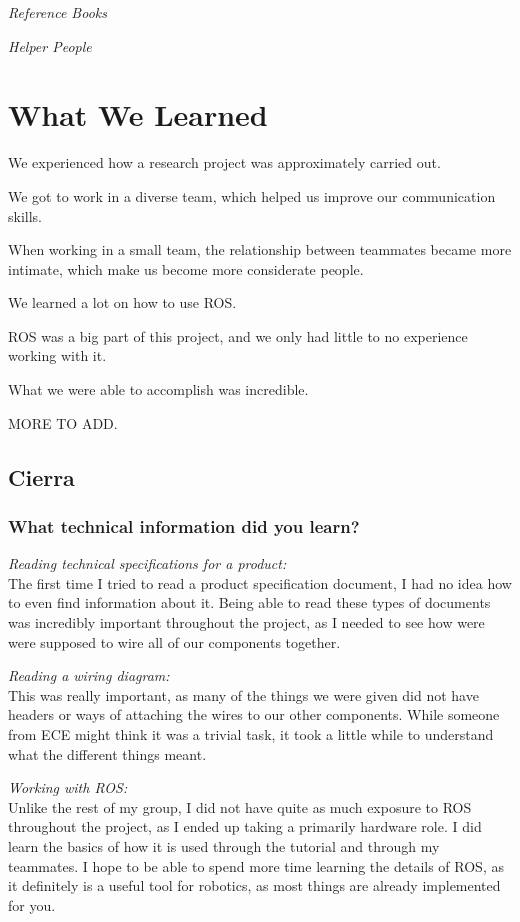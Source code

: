 \documentclass[compsoc,draftclsnofoot,onecolumn,10pt]{IEEEtran}
\begin{document}
\textit{Reference Books}

\textit{Helper People}


\section{What We Learned}

We experienced how a research project was approximately carried out.

We got to work in a diverse team, which helped us improve our communication skills.

When working in a small team, the relationship between teammates became more intimate, which make us become more considerate people.

We learned a lot on how to use ROS.

ROS was a big part of this project, and we only had little to no experience working with it.

What we were able to accomplish was incredible.

MORE TO ADD.


\subsection{Cierra}
\subsubsection*{What technical information did you learn?}

\textit{Reading technical specifications for a product:\\}
The first time I tried to read a product specification document, I had no idea how to even find information about it.
Being able to read these types of documents was incredibly important throughout the project, as I needed to see how were were supposed to wire all of our components together.

\textit{Reading a wiring diagram:\\}
This was really important, as many of the things we were given did not have headers or ways of attaching the wires to our other components.
While someone from ECE might think it was a trivial task, it took a little while to understand what the different things meant.

\textit{Working with ROS:\\}
Unlike the rest of my group, I did not have quite as much exposure to ROS throughout the project, as I ended up taking a primarily hardware role.
I did learn the basics of how it is used through the tutorial and through my teammates. I hope to be able to spend more time learning the details of ROS, as it definitely is a useful tool for robotics, as most things are already implemented for you.
\end{document}
